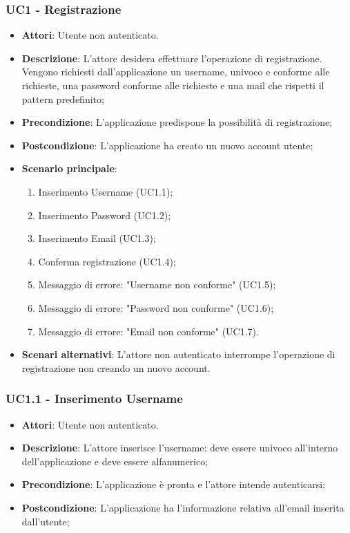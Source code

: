 \subsubsection{UC1 - Registrazione} 
\label{sssec:UC1} 
\begin{itemize} 
\item \textbf{Attori}: Utente non autenticato.
\item \textbf{Descrizione}: L'attore desidera effettuare l'operazione di registrazione. Vengono richiesti dall'applicazione un username, univoco e conforme alle richieste, una password conforme alle richieste e una mail che rispetti il pattern predefinito;
\item \textbf{Precondizione}: L'applicazione predispone la possibilità di registrazione;
\item \textbf{Postcondizione}: L'applicazione ha creato un nuovo account utente;
\item \textbf{Scenario principale}: \begin{enumerate}\item Inserimento Username (UC1.1);\item Inserimento Password (UC1.2);\item Inserimento Email (UC1.3);\item Conferma registrazione (UC1.4);\item Messaggio di errore: "Username non conforme" (UC1.5);\item Messaggio di errore: "Password non conforme" (UC1.6);\item Messaggio di errore: "Email non conforme" (UC1.7). 
 \end{enumerate}
\item \textbf{Scenari alternativi}: L’attore non autenticato interrompe l’operazione di registrazione non creando un nuovo account.
\end{itemize} 
\subsubsection{UC1.1 - Inserimento Username} 
\label{sssec:UC1.1} 
\begin{itemize} 
\item \textbf{Attori}: Utente non autenticato.
\item \textbf{Descrizione}: L’attore inserisce l'username: deve essere univoco all'interno dell'applicazione e deve essere alfanumerico;
\item \textbf{Precondizione}: L'applicazione è pronta e l'attore intende autenticarsi;
\item \textbf{Postcondizione}: L'applicazione ha l’informazione relativa all'email inserita dall’utente;
\end{itemize} 
